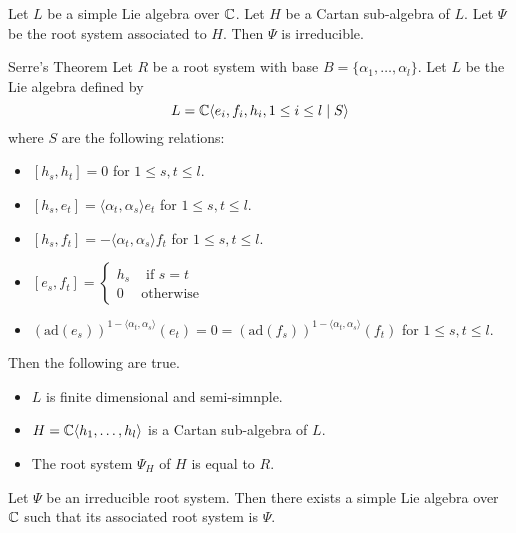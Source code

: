 \documentclass[a4paper]{article}
\begin{document}
\begin{prp}{}{} Let $L$ be a simple Lie algebra over $\mathbb{C}$. Let $H$ be a Cartan sub-algebra of $L$. Let $\Psi$ be the root system associated to $H$. Then $\Psi$ is irreducible. 
\end{prp}

\begin{thm}{Serre's Theorem}{} Let $R$ be a root system with base $B=\{\alpha_1,\dots,\alpha_l\}$. Let $L$ be the Lie algebra defined by $$L=\mathbb{C}\langle e_i,f_i,h_i, 1\leq i\leq l\;|\;S\rangle$$ where $S$ are the following relations: 
\begin{itemize}
\item $[h_s,h_t]=0$ for $1\leq s,t\leq l$. 
\item $[h_s,e_t]=\langle\alpha_t,\alpha_s\rangle e_t$ for $1\leq s,t\leq l$. 
\item $[h_s,f_t]=-\langle\alpha_t,\alpha_s\rangle f_t$ for $1\leq s,t\leq l$. 
\item $[e_s,f_t]=\begin{cases}
h_s & \text{ if } s=t\\
0 & \text{otherwise}
\end{cases}$
\item $\left(\text{ad}(e_s)\right)^{1-\langle\alpha_t,\alpha_s\rangle}(e_t)=0=\left(\text{ad}(f_s)\right)^{1-\langle\alpha_t,\alpha_s\rangle}(f_t)$ for $1\leq s,t\leq l$. 
\end{itemize}
Then the following are true. 
\begin{itemize}
\item $L$ is finite dimensional and semi-simnple. 
\item $H=\mathbb{C}\langle h_1,\dots,h_l\rangle$ is a Cartan sub-algebra of $L$. 
\item The root system $\Psi_H$ of $H$ is equal to $R$. 
\end{itemize}
\end{thm}

\begin{crl}{}{} Let $\Psi$ be an irreducible root system. Then there exists a simple Lie algebra over $\mathbb{C}$ such that its associated root system is $\Psi$. 
\end{crl}
\end{document}
